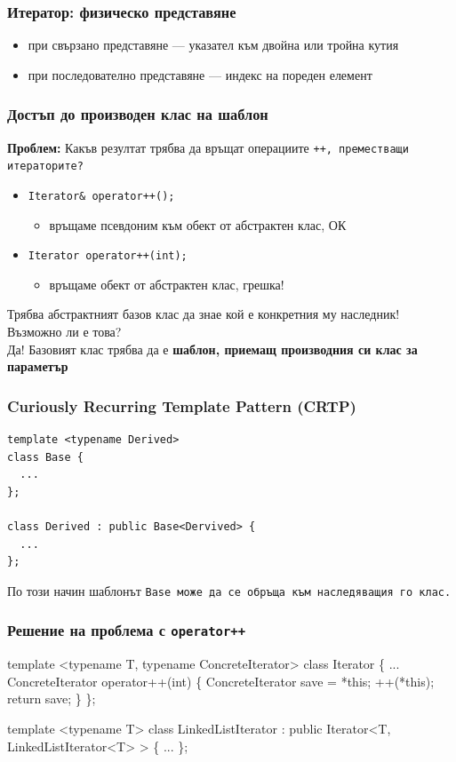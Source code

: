 \documentclass{beamer}
\begin{document}
\begin{frame}
  \frametitle{Итератор: физическо представяне}

  \begin{itemize}
  \item при свързано представяне --- указател към двойна или тройна кутия
  \item при последователно представяне --- индекс на пореден елемент
  \end{itemize}
\end{frame}

\begin{frame}
  \frametitle{Достъп до производен клас на шаблон}

  \textbf{Проблем:} Какъв резултат трябва да връщат операциите \tt{++}, преместващи итераторите?\\[1em]
  \begin{itemize}
  \item \tt{Iterator\& operator++();}
    \begin{itemize}
    \item връщаме псевдоним към обект от абстрактен клас, ОК
    \end{itemize}
  \item\tt{Iterator operator++(int);}
    \begin{itemize}
    \item връщаме обект от абстрактен клас, \alert{грешка!}
    \end{itemize}
  \end{itemize}
  \vspace{1em}
  \pause
  Трябва абстрактният базов клас да знае кой е конкретния му наследник! Възможно ли е това?\\[1em]
  \pause
  \alert{Да! Базовият клас трябва да е \textbf{шаблон, приемащ производния си клас за параметър}}
\end{frame}

\begin{frame}
  \frametitle{Curiously Recurring Template Pattern (CRTP)}

\begin{verbatim}
template <typename Derived>
class Base {
  ...
};

class Derived : public Base<Dervived> {
  ...
};
\end{verbatim}
  По този начин шаблонът \tt{Base} може да се обръща към наследяващия го клас.
\end{frame}

\begin{frame}[fragile]
  \frametitle{Решение на проблема с \tt{operator++}}
\begin{semiverbatim}
template <typename T, \alert{typename ConcreteIterator}>
class Iterator \{
  ...
  \alert{ConcreteIterator} operator++(int) \{
    ConcreteIterator save = *this;
    ++(*this);
    return save;
  \}
\};

template <typename T>
class LinkedListIterator :
         public Iterator<T, \alert{LinkedListIterator<T>} > \{
  ...
\};
\end{semiverbatim}
\end{frame}
\end{document}

